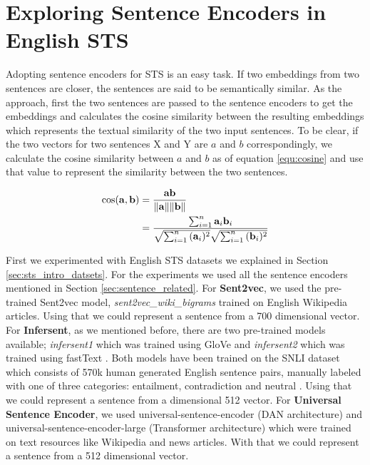 \section{Exploring Sentence Encoders in English STS}
Adopting sentence encoders for STS is an easy task.  If two embeddings from two sentences are closer, the sentences are said to be semantically similar. As the approach, first the two sentences are passed to the sentence encoders to get the embeddings and calculates the cosine similarity between the resulting embeddings which represents the textual similarity of the two input sentences. To be clear, if the two vectors for two sentences X and Y are $a$ and $b$ correspondingly, we calculate the cosine similarity between $a$ and $b$ as of equation \ref{equ:cosine} and use that value to represent the similarity between the two sentences. 

\begin{equation}
	\label{equ:cosine}
	\begin{aligned}
		\cos ({\bf a},{\bf b})= {} & {{\bf a} {\bf b} \over \|{\bf a}\| \|{\bf b}\|} \\
		= {} & \frac{ \sum_{i=1}^{n}{{\bf a}_i{\bf b}_i} }{ \sqrt{\sum_{i=1}^{n}{({\bf a}_i)^2}} \sqrt{\sum_{i=1}^{n}{({\bf b}_i)^2}} }
	\end{aligned}
\end{equation}

First we experimented with English STS datasets we explained in Section \ref{sec:sts_intro_datsets}. For the experiments we used all the sentence encoders mentioned in Section \ref{sec:sentence_related}. For \textbf{Sent2vec}, we used the pre-trained Sent2vec model, \textit{sent2vec\_wiki\_bigrams} trained on English Wikipedia articles. Using that we could represent a sentence from a 700 dimensional vector. For \textbf{Infersent}, as we mentioned before, there are two pre-trained models available; \textit{infersent1} which was trained using GloVe \cite{pennington-etal-2014-glove} and \textit{infersent2} which was trained using fastText \cite{mikolov-etal-2018-advances}. Both models have been trained on the SNLI dataset which consists of 570k human generated English sentence pairs, manually labeled with one of three categories: entailment, contradiction and neutral \cite{bowman-etal-2015-large}. Using that we could represent a sentence from a dimensional 512 vector. For \textbf{Universal Sentence Encoder}, we used universal-sentence-encoder (DAN architecture) and universal-sentence-encoder-large (Transformer architecture) which were trained on text resources like Wikipedia and news articles. With that we could represent a sentence from a 512 dimensional vector.

